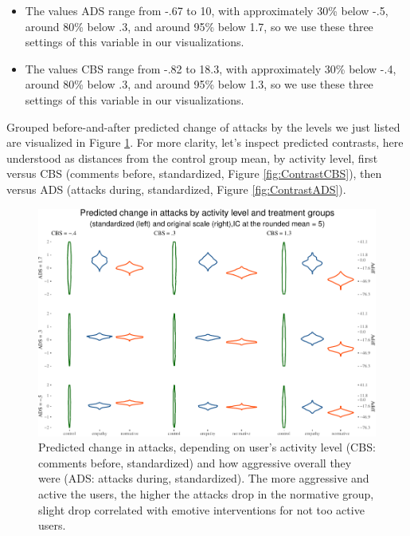 \documentclass[preprint,12pt]{elsarticle}
\begin{document}
\begin{itemize}
\item The values \textsf{ADS} range from -.67 to 10, with approximately 30\% below -.5, around 80\% below .3, and around 95\% below 1.7, so we use these three settings of this variable in our visualizations. 

\item The values \textsf{CBS} range from -.82 to 18.3, with approximately 30\% below -.4, around 80\% below .3, and around 95\% below 1.3, so we use these three settings of this variable in our visualizations. 


\end{itemize}





Grouped before-and-after predicted change of attacks by the levels we
just listed are visualized in Figure \ref{fig:predictedChange}. For more clarity, let's inspect predicted contrasts, here understood as
distances from the control group mean, by activity level, first versus
CBS (comments before, standardized, Figure \ref{fig:ContrastCBS}), then
versus ADS (attacks during, standardized, Figure \ref{fig:ContrastADS}).


\begin{figure}

\begin{center}\includegraphics[width=1\linewidth]{ figures/unnamed-chunk-5-1} \end{center}
\caption{Predicted change in attacks, depending on user’s activity level
(CBS: comments before, standardized) and how aggressive overall they
were (ADS: attacks during, standardized). The more aggressive and active
the users, the higher the attacks drop in the normative group, slight drop
correlated with emotive interventions for not too active users.}
\label{fig:predictedChange}
\end{figure}
\end{document}
